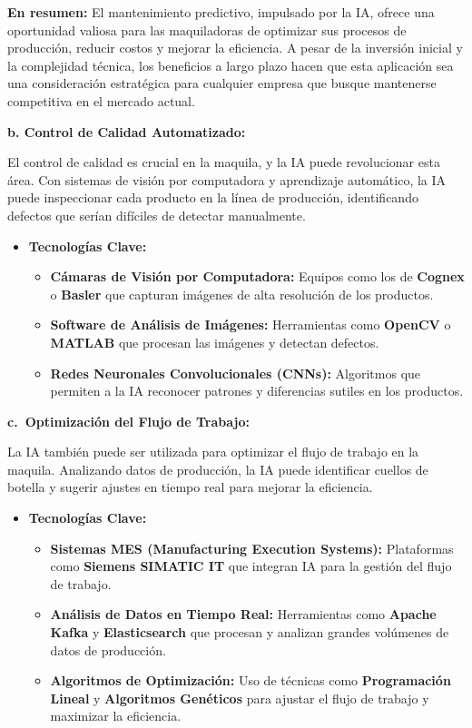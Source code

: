\documentclass[
  10pt,
  letterpaper,
]{book}
\providecommand{\tightlist}{%
  \setlength{\itemsep}{0pt}\setlength{\parskip}{0pt}}\usepackage{longtable,booktabs,array}
\begin{document}
\textbf{En resumen:} El mantenimiento predictivo, impulsado por la IA,
ofrece una oportunidad valiosa para las maquiladoras de optimizar sus
procesos de producción, reducir costos y mejorar la eficiencia. A pesar
de la inversión inicial y la complejidad técnica, los beneficios a largo
plazo hacen que esta aplicación sea una consideración estratégica para
cualquier empresa que busque mantenerse competitiva en el mercado
actual.

\textbf{b. Control de Calidad Automatizado:}

El control de calidad es crucial en la maquila, y la IA puede
revolucionar esta área. Con sistemas de visión por computadora y
aprendizaje automático, la IA puede inspeccionar cada producto en la
línea de producción, identificando defectos que serían difíciles de
detectar manualmente.

\begin{itemize}
\tightlist
\item
  \textbf{Tecnologías Clave:}

  \begin{itemize}
  \tightlist
  \item
    \textbf{Cámaras de Visión por Computadora:} Equipos como los de
    \textbf{Cognex} o \textbf{Basler} que capturan imágenes de alta
    resolución de los productos.
  \item
    \textbf{Software de Análisis de Imágenes:} Herramientas como
    \textbf{OpenCV} o \textbf{MATLAB} que procesan las imágenes y
    detectan defectos.
  \item
    \textbf{Redes Neuronales Convolucionales (CNNs):} Algoritmos que
    permiten a la IA reconocer patrones y diferencias sutiles en los
    productos.
  \end{itemize}
\end{itemize}

\textbf{c.~Optimización del Flujo de Trabajo:}

La IA también puede ser utilizada para optimizar el flujo de trabajo en
la maquila. Analizando datos de producción, la IA puede identificar
cuellos de botella y sugerir ajustes en tiempo real para mejorar la
eficiencia.

\begin{itemize}
\tightlist
\item
  \textbf{Tecnologías Clave:}

  \begin{itemize}
  \tightlist
  \item
    \textbf{Sistemas MES (Manufacturing Execution Systems):} Plataformas
    como \textbf{Siemens SIMATIC IT} que integran IA para la gestión del
    flujo de trabajo.
  \item
    \textbf{Análisis de Datos en Tiempo Real:} Herramientas como
    \textbf{Apache Kafka} y \textbf{Elasticsearch} que procesan y
    analizan grandes volúmenes de datos de producción.
  \item
    \textbf{Algoritmos de Optimización:} Uso de técnicas como
    \textbf{Programación Lineal} y \textbf{Algoritmos Genéticos} para
    ajustar el flujo de trabajo y maximizar la eficiencia.
  \end{itemize}
\end{itemize}
\end{document}
